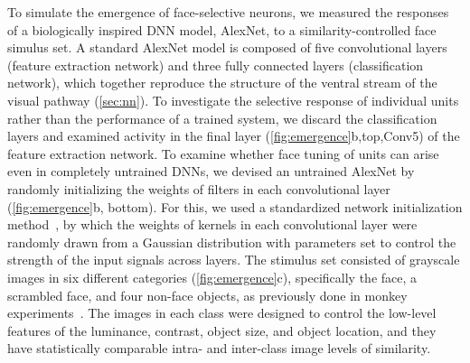 \documentclass[sn-mathphys-num]{sn-jnl}%
\theoremstyle{thmstyleone}%
\theoremstyle{thmstyletwo}%
\theoremstyle{thmstylethree}%
\begin{document}
To simulate the emergence of face-selective neurons, we measured the responses of a biologically inspired DNN model, AlexNet\cite{krizhevsky2012imagenet}, to a similarity-controlled face simulus set.
A standard AlexNet model is composed of five convolutional layers (feature extraction network) and three fully connected layers (classification network), which together reproduce the structure of the ventral stream of the visual pathway (\ref{sec:nn}).
To investigate the selective response of individual units rather than the performance of a trained system, 
we discard the classification layers and examined activity in the final layer (\ref{fig:emergence}b,top,Conv5) of the feature extraction network.
To examine whether face tuning of units can arise even in completely untrained DNNs, 
we devised an untrained AlexNet by randomly initializing the weights of filters in each convolutional layer (\ref{fig:emergence}b, bottom).
For this, we used a standardized network initialization method~\cite{lecun2012efficient}, by which the weights of kernels in each convolutional layer were randomly drawn from a Gaussian distribution with parameters set to control the strength of the input signals across layers.
The stimulus set consisted of grayscale images in six different categories (\ref{fig:emergence}c), specifically the face, a scrambled face, and four non-face objects, as previously done in monkey experiments~\cite{stigliani2015temporal}.
The images in each class were designed to control the low-level features of the luminance, contrast, object size, and object location, and they have statistically comparable intra- and inter-class image levels of similarity.
\end{document}
